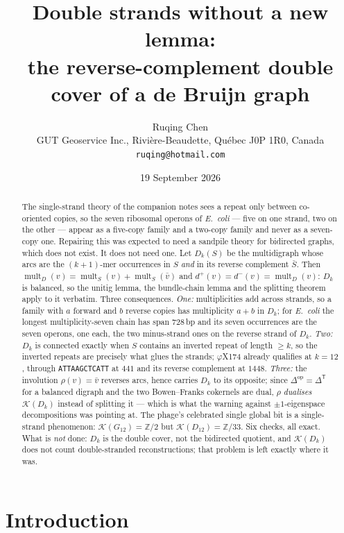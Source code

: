 \documentclass[11pt]{article}
\title{\bfseries Double strands without a new lemma:\\
the reverse-complement double cover of a de Bruijn graph}
\author{Ruqing Chen\\[2pt]
\normalsize GUT Geoservice Inc., Rivi\`ere-Beaudette, Qu\'ebec J0P 1R0, Canada\\
\normalsize\texttt{ruqing@hotmail.com}}
\date{19 September 2026}
\theoremstyle{plain}
\theoremstyle{definition}
\theoremstyle{remark}
\newcommand{\Z}{\mathbb{Z}}
\newcommand{\K}{\mathcal{K}}
\newcommand{\mult}{\operatorname{mult}}
\begin{document}
\maketitle

\begin{abstract}
\noindent
The single-strand theory of the companion notes sees a repeat only between co-oriented
copies, so the seven ribosomal operons of \emph{E.\ coli} --- five on one strand, two on
the other --- appear as a five-copy family and a two-copy family and never as a
seven-copy one. Repairing this was expected to need a sandpile theory for bidirected
graphs, which does not exist. It does not need one. Let $D_k(S)$ be the multidigraph
whose arcs are the $(k{+}1)$-mer occurrences in $S$ \emph{and} in its reverse complement
$\bar S$. Then $\mult_D(v)=\mult_S(v)+\mult_S(\bar v)$ and
$d^{+}(v)=d^{-}(v)=\mult_D(v)$: $D_k$ is balanced, so the unitig lemma, the bundle-chain
lemma and the splitting theorem apply to it verbatim. Three consequences. \emph{One:}
multiplicities add across strands, so a family with $a$ forward and $b$ reverse copies has
multiplicity $a+b$ in $D_k$; for \emph{E.\ coli} the longest multiplicity-seven chain has
span $728$\,bp and its seven occurrences are the seven operons, one each, the two
minus-strand ones on the reverse strand of $D_k$. \emph{Two:} $D_k$ is connected exactly
when $S$ contains an inverted repeat of length $\ge k$, so the inverted repeats are
precisely what glues the strands; $\varphi$X174 already qualifies at $k=12$, through
\texttt{ATTAAGCTCATT} at $441$ and its reverse complement at $1448$. \emph{Three:} the
involution $\rho(v)=\bar v$ reverses arcs, hence carries $D_k$ to its opposite; since
$\Delta^{\mathrm{op}}=\Delta^{\mathsf T}$ for a balanced digraph and the two Bowen--Franks
cokernels are dual, $\rho$ \emph{dualises} $\K(D_k)$ instead of splitting it --- which is
what the warning against $\pm1$-eigenspace decompositions was pointing at. The phage's
celebrated single global bit is a single-strand phenomenon: $\K(G_{12})=\Z/2$ but
$\K(D_{12})=\Z/33$. Six checks, all exact. What is \emph{not} done: $D_k$ is the double
cover, not the bidirected quotient, and $\K(D_k)$ does not count double-stranded
reconstructions; that problem is left exactly where it was.
\end{abstract}

\section{Introduction}\label{sec:intro}
\end{document}
